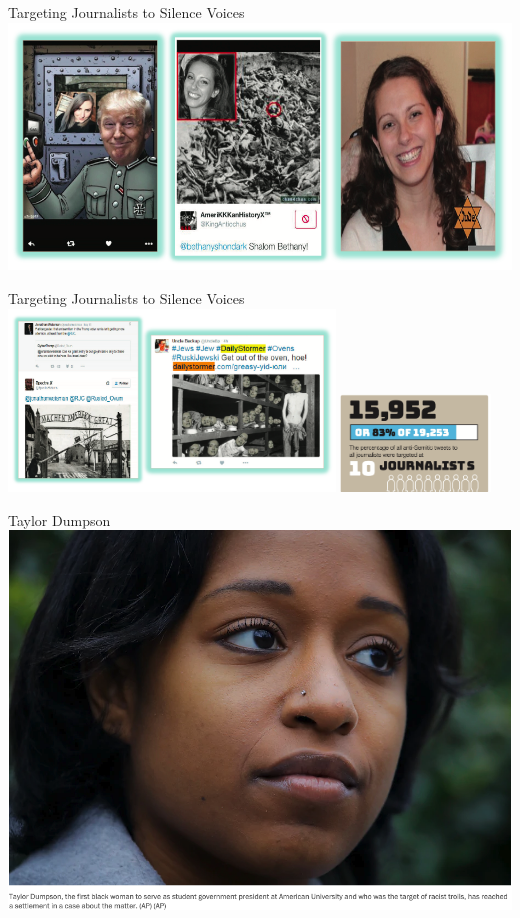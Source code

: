 \documentclass[nobackground,dvipsnames,table]{beamer}
\begin{document}
\begin{frame}{Targeting Journalists to Silence Voices}
    \includegraphics[width=\textwidth]{targeting-journalists}
\end{frame}

\begin{frame}{Targeting Journalists to Silence Voices}
    \includegraphics[width=0.65\textwidth]{silencing-journalists-holocaust}
    \includegraphics[width=0.3\textwidth]{anti-semitic-tweets-stats}
\end{frame}

\begin{frame}{Taylor Dumpson}
    \includegraphics[width=\textwidth]{taylor-dumpson}
\end{frame}
\end{document}
